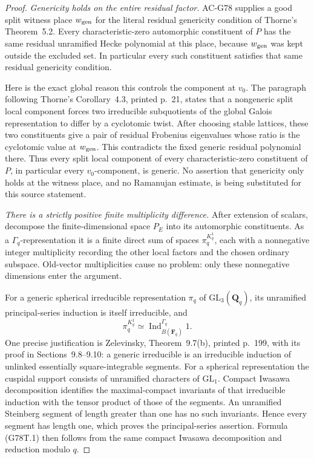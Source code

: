 \begin{proof}
\emph{Genericity holds on the entire residual factor.}
AC-G78 supplies a good split witness place \(w_{\rm gen}\) for
the literal residual genericity condition of Thorne's
Theorem~5.2.
Every characteristic-zero automorphic constituent of \(P\)
has the same residual unramified Hecke polynomial at this place,
because \(w_{\rm gen}\) was kept outside the excluded set.
In particular every such constituent satisfies that same
residual genericity condition.

Here is the exact global reason this controls the component
at \(v_0\).  The paragraph following Thorne's Corollary~4.3,
printed p.~21, states that a nongeneric split local component
forces two irreducible subquotients of the global Galois
representation to differ by a cyclotomic twist.
After choosing stable lattices, these two constituents give
a pair of residual Frobenius eigenvalues whose ratio is the
cyclotomic value at \(w_{\rm gen}\).
This contradicts the fixed generic residual polynomial there.
Thus every split local component of every characteristic-zero
constituent of \(P\), in particular every \(v_0\)-component,
is generic.
No assertion that genericity only holds at the witness place,
and no Ramanujan estimate, is being substituted for this source
statement.

\emph{There is a strictly positive finite multiplicity difference.}
After extension of scalars, decompose the finite-dimensional
space \(P_E\) into its automorphic constituents.
As a \(\Gamma_q\)-representation it is a finite direct sum of
spaces \(\pi_q^{K_q^1}\), each with a nonnegative integer
multiplicity recording the other local factors and the chosen
ordinary subspace.
Old-vector multiplicities cause no problem: only these
nonnegative dimensions enter the argument.

For a generic spherical irreducible representation \(\pi_q\)
of \(\mathrm{GL}_3(\mathbf Q_q)\), its unramified principal-series
induction is itself irreducible, and
\[
 \pi_q^{K_q^1}\simeq
       \operatorname{Ind}_{B(\mathbf F_q)}^{\Gamma_q}1.
 \tag{G78T.1}
\]
One precise justification is Zelevinsky, Theorem~9.7(b),
printed p.~199, with its proof in Sections~9.8--9.10:
a generic irreducible is an irreducible induction of unlinked
essentially square-integrable segments.
For a spherical representation the cuspidal support consists
of unramified characters of \(\mathrm{GL}_1\).
Compact Iwasawa decomposition identifies the maximal-compact
invariants of that irreducible induction with the tensor product
of those of the segments.
An unramified Steinberg segment of length greater than one has
no such invariants.  Hence every segment has length one,
which proves the principal-series assertion.
Formula (G78T.1) then follows from the same compact Iwasawa
decomposition and reduction modulo \(q\).


\end{proof}
